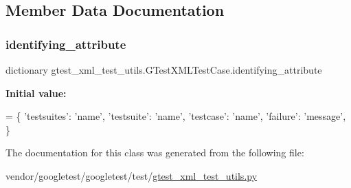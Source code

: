 \subsection{Member Data Documentation}
\mbox{\label{classgtest__xml__test__utils_1_1_g_test_x_m_l_test_case_a0e3a4e84e18f29d2248dcd670a0a6ae6}} 
\subsubsection{\texorpdfstring{identifying\+\_\+attribute}{identifying\_attribute}}
{\footnotesize\ttfamily dictionary gtest\+\_\+xml\+\_\+test\+\_\+utils.\+G\+Test\+X\+M\+L\+Test\+Case.\+identifying\+\_\+attribute\hspace{0.3cm}{\ttfamily [static]}}

{\bfseries Initial value\+:}
\begin{DoxyCode}
=  \{
    \textcolor{stringliteral}{'testsuites'}: \textcolor{stringliteral}{'name'},
    \textcolor{stringliteral}{'testsuite'}: \textcolor{stringliteral}{'name'},
    \textcolor{stringliteral}{'testcase'}:  \textcolor{stringliteral}{'name'},
    \textcolor{stringliteral}{'failure'}:   \textcolor{stringliteral}{'message'},
    \}
\end{DoxyCode}


The documentation for this class was generated from the following file\+:\begin{DoxyCompactItemize}
\item 
vendor/googletest/googletest/test/\hyperlink{gtest__xml__test__utils_8py}{gtest\+\_\+xml\+\_\+test\+\_\+utils.\+py}\end{DoxyCompactItemize}
